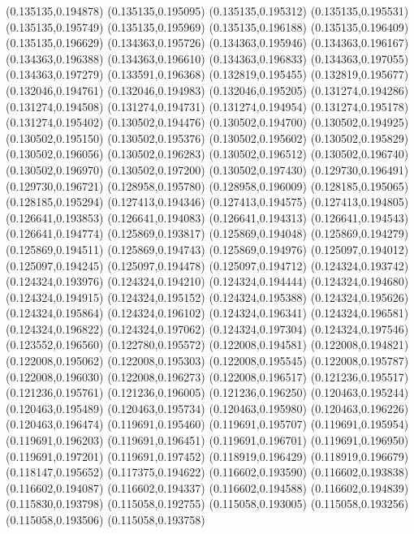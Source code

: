 (0.135135,0.194878)
(0.135135,0.195095)
(0.135135,0.195312)
(0.135135,0.195531)
(0.135135,0.195749)
(0.135135,0.195969)
(0.135135,0.196188)
(0.135135,0.196409)
(0.135135,0.196629)
(0.134363,0.195726)
(0.134363,0.195946)
(0.134363,0.196167)
(0.134363,0.196388)
(0.134363,0.196610)
(0.134363,0.196833)
(0.134363,0.197055)
(0.134363,0.197279)
(0.133591,0.196368)
(0.132819,0.195455)
(0.132819,0.195677)
(0.132046,0.194761)
(0.132046,0.194983)
(0.132046,0.195205)
(0.131274,0.194286)
(0.131274,0.194508)
(0.131274,0.194731)
(0.131274,0.194954)
(0.131274,0.195178)
(0.131274,0.195402)
(0.130502,0.194476)
(0.130502,0.194700)
(0.130502,0.194925)
(0.130502,0.195150)
(0.130502,0.195376)
(0.130502,0.195602)
(0.130502,0.195829)
(0.130502,0.196056)
(0.130502,0.196283)
(0.130502,0.196512)
(0.130502,0.196740)
(0.130502,0.196970)
(0.130502,0.197200)
(0.130502,0.197430)
(0.129730,0.196491)
(0.129730,0.196721)
(0.128958,0.195780)
(0.128958,0.196009)
(0.128185,0.195065)
(0.128185,0.195294)
(0.127413,0.194346)
(0.127413,0.194575)
(0.127413,0.194805)
(0.126641,0.193853)
(0.126641,0.194083)
(0.126641,0.194313)
(0.126641,0.194543)
(0.126641,0.194774)
(0.125869,0.193817)
(0.125869,0.194048)
(0.125869,0.194279)
(0.125869,0.194511)
(0.125869,0.194743)
(0.125869,0.194976)
(0.125097,0.194012)
(0.125097,0.194245)
(0.125097,0.194478)
(0.125097,0.194712)
(0.124324,0.193742)
(0.124324,0.193976)
(0.124324,0.194210)
(0.124324,0.194444)
(0.124324,0.194680)
(0.124324,0.194915)
(0.124324,0.195152)
(0.124324,0.195388)
(0.124324,0.195626)
(0.124324,0.195864)
(0.124324,0.196102)
(0.124324,0.196341)
(0.124324,0.196581)
(0.124324,0.196822)
(0.124324,0.197062)
(0.124324,0.197304)
(0.124324,0.197546)
(0.123552,0.196560)
(0.122780,0.195572)
(0.122008,0.194581)
(0.122008,0.194821)
(0.122008,0.195062)
(0.122008,0.195303)
(0.122008,0.195545)
(0.122008,0.195787)
(0.122008,0.196030)
(0.122008,0.196273)
(0.122008,0.196517)
(0.121236,0.195517)
(0.121236,0.195761)
(0.121236,0.196005)
(0.121236,0.196250)
(0.120463,0.195244)
(0.120463,0.195489)
(0.120463,0.195734)
(0.120463,0.195980)
(0.120463,0.196226)
(0.120463,0.196474)
(0.119691,0.195460)
(0.119691,0.195707)
(0.119691,0.195954)
(0.119691,0.196203)
(0.119691,0.196451)
(0.119691,0.196701)
(0.119691,0.196950)
(0.119691,0.197201)
(0.119691,0.197452)
(0.118919,0.196429)
(0.118919,0.196679)
(0.118147,0.195652)
(0.117375,0.194622)
(0.116602,0.193590)
(0.116602,0.193838)
(0.116602,0.194087)
(0.116602,0.194337)
(0.116602,0.194588)
(0.116602,0.194839)
(0.115830,0.193798)
(0.115058,0.192755)
(0.115058,0.193005)
(0.115058,0.193256)
(0.115058,0.193506)
(0.115058,0.193758)
